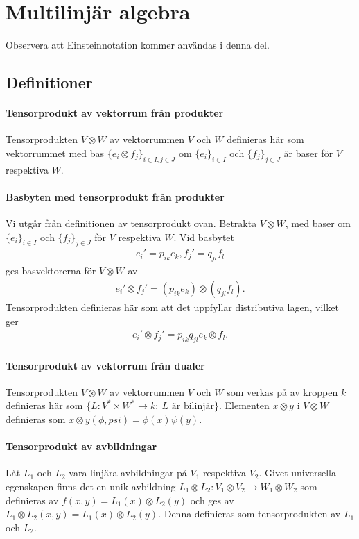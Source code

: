 \section{Multilinjär algebra}

Observera att Einsteinnotation kommer användas i denna del.

\subsection{Definitioner}

\paragraph{Tensorprodukt av vektorrum från produkter}
Tensorprodukten $V\otimes W$ av vektorrummen $V$ och $W$ definieras här som vektorrummet med bas $\{e_{i}\otimes f_{j}\}_{i\in I, j\in J}$ om $\{e_{i}\}_{i\in I}$ och $\{f_{j}\}_{j\in J}$ är baser för $V$ respektiva $W$.

\paragraph{Basbyten med tensorprodukt från produkter}
Vi utgår från definitionen av tensorprodukt ovan. Betrakta $V\otimes W$, med baser om $\{e_{i}\}_{i\in I}$ och $\{f_{j}\}_{j\in J}$ för $V$ respektiva $W$. Vid basbytet
\begin{align*}
	e_{i}' = p_{ik}e_{k}, f_{j}' = q_{jl}f_{l}
\end{align*}
ges basvektorerna för $V\otimes W$ av
\begin{align*}
	e_{i}'\otimes f_{j}' = (p_{ik}e_{k})\otimes (q_{jl}f_{l}).
\end{align*}
Tensorprodukten definieras här som att det uppfyllar distributiva lagen, vilket ger
\begin{align*}
	e_{i}'\otimes f_{j}' = p_{ik}q_{jl}e_{k}\otimes f_{l}.
\end{align*}

\paragraph{Tensorprodukt av vektorrum från dualer}
Tensorprodukten $V\otimes W$ av vektorrummen $V$ och $W$ som verkas på av kroppen $k$ definieras här som $\{L: V^{*}\times W^{*}\to k:\ L\text{ är bilinjär}\}$. Elementen $x\otimes y$ i $V\otimes W$ definieras som $x\otimes y(\phi, psi) = \phi(x)\psi(y)$.

\paragraph{Tensorprodukt av avbildningar}
Låt $L_{1}$ och $L_{2}$ vara linjära avbildningar på $V_{1}$ respektiva $V_{2}$. Givet universella egenskapen finns det en unik avbildning $L_{1}\otimes L_{2}: V_{1}\otimes V_{2}\to W_{1}\otimes W_{2}$ som definieras av $f(x, y) = L_{1}(x)\otimes L_{2}(y)$ och ges av $L_{1}\otimes L_{2}(x, y) = L_{1}(x)\otimes L_{2}(y)$. Denna definieras som tensorprodukten av $L_{1}$ och $L_{2}$.

